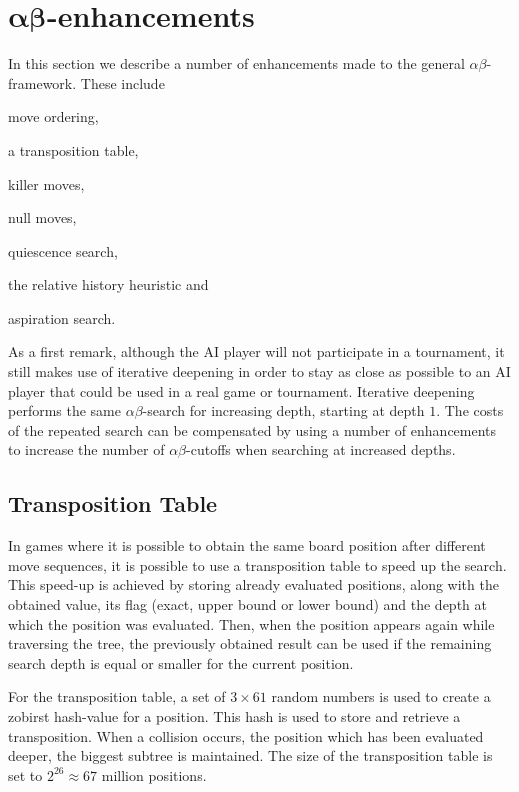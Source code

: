 \documentclass[11pt]{article}
\begin{document}
\section{\texorpdfstring{$\boldsymbol{\alpha\beta}$}{alphabeta}-enhancements}
\label{-sec:alphabeta-enhancements}%
In this section we describe a number of enhancements made to the general $\alpha\beta$-framework. These include \begin{enumerate*}\item move ordering, \item a transposition table, \item killer moves, \item null moves, \item quiescence search, \item the relative history heuristic and \item aspiration search.\end{enumerate*}
As a first remark, although the AI player will not participate in a tournament, it still makes use of iterative deepening in order to stay as close as possible to an AI player that could be used in a real game or tournament. Iterative deepening performs the same $\alpha\beta$-search for increasing depth, starting at depth $1$. The costs of the repeated search can be compensated by using a number of enhancements to increase the number of $\alpha\beta$-cutoffs when searching at increased depths.

\subsection{Transposition Table}
\label{-subsec:transpositiontable}
In games where it is possible to obtain the same board position after different move sequences, it is possible to use a transposition table to speed up the search. This speed-up is achieved by storing already evaluated positions, along with the obtained value, its flag (exact, upper bound or lower bound) and the depth at which the position was evaluated. Then, when the position appears again while traversing the tree, the previously obtained result can be used if the remaining search depth is equal or smaller for the current position.

For the transposition table, a set of $3\times 61$ random numbers is used to create a zobirst hash-value for a position. This hash is used to store and retrieve a transposition. When a collision occurs, the position which has been evaluated deeper, \ie the biggest subtree is maintained. The size of the transposition table is set to $2^{26}\approx 67$ million positions.
\end{document}
